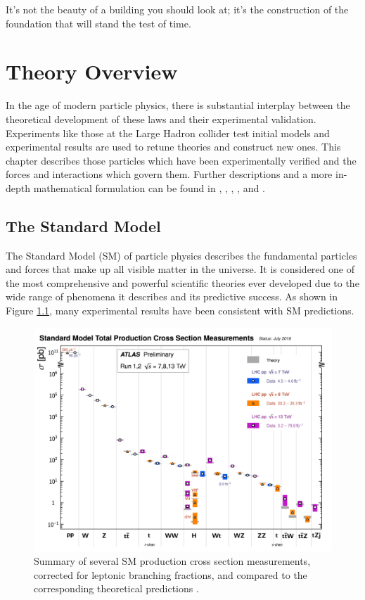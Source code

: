 \begin{savequote}[75mm]
It's not the beauty of a building you should look at; it's the construction of the foundation that will stand the test of time.
\end{savequote}

\chapter{Theory Overview}

 In the age of modern particle physics, there is substantial interplay between the theoretical development of these laws and their experimental validation. Experiments like those at the Large Hadron collider test initial models and experimental results are used to retune theories and construct new ones. This chapter describes those particles which have been experimentally verified and the forces and interactions which govern them. Further descriptions and a more in-depth mathematical formulation can be found in \cite{griffiths}, \cite{thomson}, \cite{schwartz}, \cite{peskin}, and \cite{srednicki}.

\section{The Standard Model}
The Standard Model (SM) of particle physics describes the fundamental particles and forces that make up all visible matter in the universe. It is considered one of the most comprehensive and powerful scientific theories ever developed due to the wide range of phenomena it describes and its predictive success. As shown in Figure \ref{fig:xc_summ}, many experimental results have been consistent with SM predictions.\\

\begin{figure}[htb!]
    \centering
    \includegraphics[width=4.5in]{figures/chapter1/sm_xc_summary.pdf}
    \caption{Summary of several SM production cross section measurements, corrected for leptonic branching fractions, and compared to the corresponding theoretical predictions \cite{sm_summary_plots}.}
    \label{fig:xc_summ}
\end{figure}

